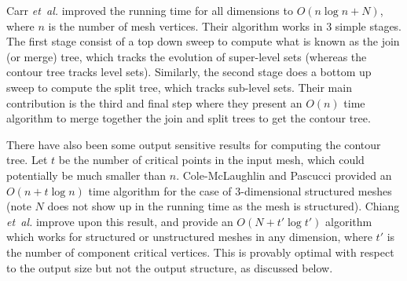 \documentclass[11pt]{article}
\theoremstyle{definition}
\newcommand{\etal}{\textit{et~al.}\xspace}
\begin{document}
Carr \etal \cite{csa-cctad-00} improved the running time for all dimensions to $O(n\log n + N)$, 
where $n$ is the number of mesh vertices.  Their algorithm works in 3 simple stages.  
The first stage consist of a top down sweep to compute what is known as the join (or merge) tree, 
which tracks the evolution of super-level sets (whereas the contour tree tracks level sets).  
Similarly, the second stage does a bottom up sweep to compute the split tree, which tracks sub-level sets.  
Their main contribution is the third and final step where they present an $O(n)$ time algorithm to merge 
together the join and split trees to get the contour tree.  

There have also been some output sensitive results for computing the contour tree.  Let $t$ be the number 
of critical points in the input mesh, which could potentially be much smaller than $n$.  
Cole-McLaughlin and Pascucci \cite{pc-ectls-02} provided an $O(n+t\log n)$ time algorithm for the case of 
$3$-dimensional structured meshes (note $N$ does not show up in the running time as the mesh is structured).
Chiang \etal \cite{cllr-sooscctmp-05} improve upon this result, and provide an $O(N+t'\log t')$ algorithm 
which works for structured or unstructured meshes in any dimension, where $t'$ is the number of component 
critical vertices.  This is provably optimal with respect to the output size but not the output structure, 
as discussed below.

\end{document}
